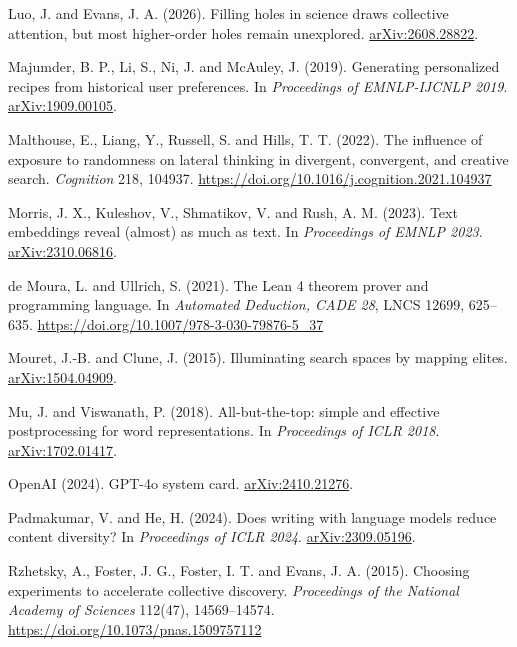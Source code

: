\documentclass[
  10pt,
]{article}
\begin{document}
\hypertarget{ref-Luo2026}{}Luo, J. and
Evans, J. A. (2026). Filling holes in
science draws collective attention, but
most higher-order holes remain
unexplored.
\href{https://arxiv.org/abs/2608.28822}{arXiv:2608.28822}.

\hypertarget{ref-Majumder2019}{}Majumder,
B. P., Li, S., Ni, J. and McAuley, J.
(2019). Generating personalized recipes
from historical user preferences. In
\emph{Proceedings of EMNLP-IJCNLP 2019}.
\href{https://arxiv.org/abs/1909.00105}{arXiv:1909.00105}.

\hypertarget{ref-Malthouse2022}{}Malthouse,
E., Liang, Y., Russell, S. and Hills, T.
T. (2022). The influence of exposure to
randomness on lateral thinking in
divergent, convergent, and creative
search. \emph{Cognition} 218, 104937.
\url{https://doi.org/10.1016/j.cognition.2021.104937}

\hypertarget{ref-Morris2023}{}Morris, J.
X., Kuleshov, V., Shmatikov, V. and
Rush, A. M. (2023). Text embeddings
reveal (almost) as much as text. In
\emph{Proceedings of EMNLP 2023}.
\href{https://arxiv.org/abs/2310.06816}{arXiv:2310.06816}.

\hypertarget{ref-Moura2021}{}de Moura,
L. and Ullrich, S. (2021). The Lean 4
theorem prover and programming language.
In \emph{Automated Deduction, CADE 28},
LNCS 12699, 625--635.
\url{https://doi.org/10.1007/978-3-030-79876-5_37}

\hypertarget{ref-Mouret2015}{}Mouret,
J.-B. and Clune, J. (2015). Illuminating
search spaces by mapping elites.
\href{https://arxiv.org/abs/1504.04909}{arXiv:1504.04909}.

\hypertarget{ref-Mu2018}{}Mu, J. and
Viswanath, P. (2018). All-but-the-top:
simple and effective postprocessing for
word representations. In
\emph{Proceedings of ICLR 2018}.
\href{https://arxiv.org/abs/1702.01417}{arXiv:1702.01417}.

\hypertarget{ref-OpenAI2024}{}OpenAI
(2024). GPT-4o system card.
\href{https://arxiv.org/abs/2410.21276}{arXiv:2410.21276}.

\hypertarget{ref-Padmakumar2024}{}Padmakumar,
V. and He, H. (2024). Does writing with
language models reduce content
diversity? In \emph{Proceedings of ICLR
2024}.
\href{https://arxiv.org/abs/2309.05196}{arXiv:2309.05196}.

\hypertarget{ref-Rzhetsky2015}{}Rzhetsky,
A., Foster, J. G., Foster, I. T. and
Evans, J. A. (2015). Choosing
experiments to accelerate collective
discovery. \emph{Proceedings of the
National Academy of Sciences} 112(47),
14569--14574.
\url{https://doi.org/10.1073/pnas.1509757112}
\end{document}
